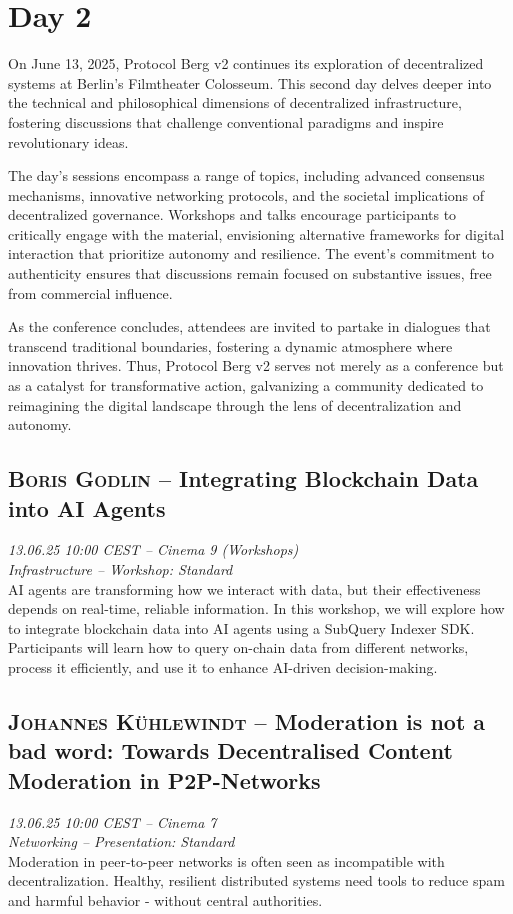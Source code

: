 \section {Day 2} On June 13, 2025, Protocol Berg v2 continues its exploration of decentralized systems at Berlin's Filmtheater Colosseum. This second day delves deeper into the technical and philosophical dimensions of decentralized infrastructure, fostering discussions that challenge conventional paradigms and inspire revolutionary ideas.\par The day's sessions encompass a range of topics, including advanced consensus mechanisms, innovative networking protocols, and the societal implications of decentralized governance. Workshops and talks encourage participants to critically engage with the material, envisioning alternative frameworks for digital interaction that prioritize autonomy and resilience. The event's commitment to authenticity ensures that discussions remain focused on substantive issues, free from commercial influence.\par As the conference concludes, attendees are invited to partake in dialogues that transcend traditional boundaries, fostering a dynamic atmosphere where innovation thrives. Thus, Protocol Berg v2 serves not merely as a conference but as a catalyst for transformative action, galvanizing a community dedicated to reimagining the digital landscape through the lens of decentralization and autonomy.\par \cleardoublepage
\subsection {\textsc{Boris Godlin}  -- Integrating Blockchain Data into AI Agents} \noindent \textit {13.06.25 10:00 CEST -- Cinema 9 (Workshops)\\ Infrastructure -- Workshop: Standard}\\[1em] AI agents are transforming how we interact with data, but their effectiveness depends on real-time, reliable information. In this workshop, we will explore how to integrate blockchain data into AI agents using a SubQuery Indexer SDK. Participants will learn how to query on-chain data from different networks, process it efficiently, and use it to enhance AI-driven decision-making.

\clearpage
\subsection {\textsc{Johannes Kühlewindt}  -- Moderation is not a bad word: Towards Decentralised Content Moderation in P2P-Networks} \noindent \textit {13.06.25 10:00 CEST -- Cinema 7\\ Networking -- Presentation: Standard}\\[1em] Moderation in peer-to-peer networks is often seen as incompatible with decentralization. Healthy, resilient distributed systems need tools to reduce spam and harmful behavior - without central authorities.

